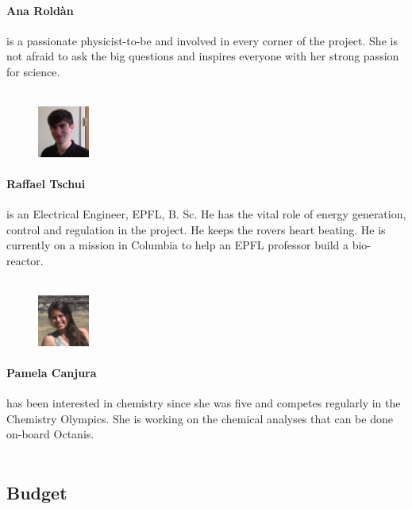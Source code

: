 \documentclass[a4paper,12pt]{article}
\begin{document}
\paragraph{Ana Roldàn} is a passionate physicist-to-be and involved in every corner of the project. She is not afraid to ask the big questions and inspires everyone with her strong passion for science.
\\ \\

\begin{figure}
     \centering
     \vspace{-13pt}
    \includegraphics[width=0.15\textwidth]{raf}
\end{figure} 
\paragraph{Raffael Tschui} is an Electrical Engineer, EPFL, B. Sc. He has the vital role of energy generation, control and regulation in the project. He keeps the rovers heart beating. He is currently on a mission in Columbia to help an EPFL professor build a bio-reactor.
\\ \\

\begin{figure}
    \centering
    \vspace{-13pt}
    \includegraphics[width=0.15\textwidth]{pam}
\end{figure} 
\paragraph{Pamela Canjura} has been interested in chemistry since she was five and competes regularly in the Chemistry Olympics. She is working on the chemical analyses that can be done on-board Octanis.
\\ \\


\subsection{Budget}
\end{document}
